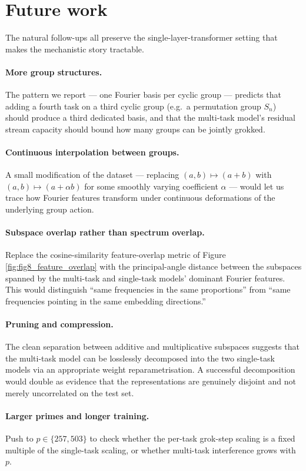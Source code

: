 \section{Future work}
\label{sec:future_work}

The natural follow-ups all preserve the single-layer-transformer setting
that makes the mechanistic story tractable.

\paragraph{More group structures.}
The pattern we report --- one Fourier basis per cyclic group ---
predicts that adding a fourth task on a third cyclic group (e.g.\ a
permutation group $S_n$) should produce a third dedicated basis, and
that the multi-task model's residual stream capacity should bound how
many groups can be jointly grokked.

\paragraph{Continuous interpolation between groups.}
A small modification of the dataset --- replacing $(a, b) \mapsto (a + b)$
with $(a, b) \mapsto (a + \alpha b)$ for some smoothly varying
coefficient $\alpha$ --- would let us trace how Fourier features
transform under continuous deformations of the underlying group action.

\paragraph{Subspace overlap rather than spectrum overlap.}
Replace the cosine-similarity feature-overlap metric of Figure
\ref{fig:fig8_feature_overlap} with the principal-angle distance
between the subspaces spanned by the multi-task and single-task models'
dominant Fourier features. This would distinguish ``same frequencies in
the same proportions'' from ``same frequencies pointing in the same
embedding directions.''

\paragraph{Pruning and compression.}
The clean separation between additive and multiplicative subspaces
suggests that the multi-task model can be losslessly decomposed into
the two single-task models via an appropriate weight reparametrisation.
A successful decomposition would double as evidence that the
representations are genuinely disjoint and not merely uncorrelated on
the test set.

\paragraph{Larger primes and longer training.}
Push to $p \in \{257, 503\}$ to check whether the per-task grok-step
scaling is a fixed multiple of the single-task scaling, or whether
multi-task interference grows with $p$.
